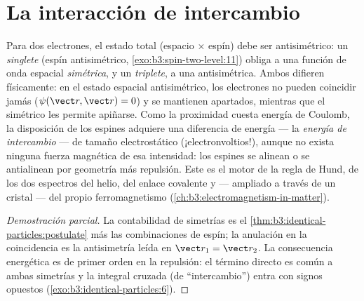 \section{La interacción de intercambio}

\begin{proposition}\label{prop:b3:identical-particles:exchange-force}
Para dos electrones, el estado total (espacio $\times$ espín) debe ser
antisimétrico: un \emph{singlete} (espín antisimétrico,
\cref{exo:b3:spin-two-level:11}) obliga a una función de onda espacial
\emph{simétrica}, y un \emph{triplete}, a una antisimétrica. Ambos difieren
físicamente: en el estado espacial antisimétrico, los electrones no pueden
coincidir jamás ($\psi(\vect r, \vect r) = 0$) y se mantienen apartados,
mientras que el simétrico les permite apiñarse. Como la proximidad cuesta
energía de Coulomb, la disposición de los espines adquiere una diferencia de
energía --- la \emph{energía de intercambio} --- de tamaño electrostático
(¡electronvoltios!), aunque no exista ninguna fuerza magnética de esa
intensidad: los espines se alinean o se antialinean por geometría más
repulsión. Este es el motor de la regla de Hund, de los dos espectros del
helio, del enlace covalente y --- ampliado a través de un cristal --- del
propio ferromagnetismo
(\cref{ch:b3:electromagnetism-in-matter}).
\end{proposition}

\begin{proof}[Demostración parcial]
La contabilidad de simetrías es el
\cref{thm:b3:identical-particles:postulate} más las combinaciones de
espín; la anulación en la coincidencia es la antisimetría leída en
$\vect r_1 = \vect r_2$. La consecuencia energética es  de primer orden en la repulsión: el término directo es común
a ambas simetrías y la integral cruzada (de ``intercambio'') entra con
signos opuestos (\cref{exo:b3:identical-particles:6}).
\end{proof}

